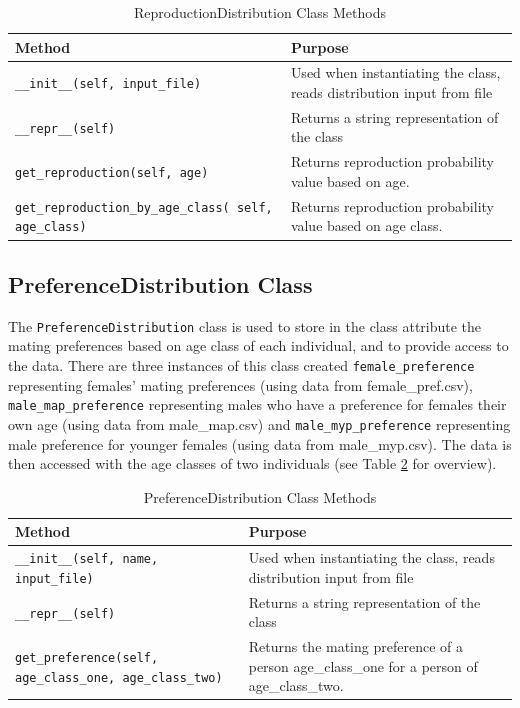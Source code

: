 \documentclass[authoryearcitations]{UoYCSproject}
\begin{document}
\begin{table}[h]
\caption{ReproductionDistribution Class Methods}
\label{tbl:reproductionDistributionMethods}
\begin{tabular}{m{} m{}}
\textbf{Method} & \textbf{Purpose} \\\hline
\texttt{\_\_init\_\_(self, input\_file)} & Used when instantiating the class, reads distribution input from file\\\hline
\texttt{\_\_repr\_\_(self)} & Returns a string representation of the class \\\hline
\texttt{get\_reproduction(self, age)} & Returns reproduction probability value based on age.\\\hline
\small\texttt{get\_reproduction\_by\_age\_class( self, age\_class)} \normalsize &  Returns reproduction probability value based on age class.
\end{tabular}
\end{table}

\subsection{PreferenceDistribution Class}
The \texttt{PreferenceDistribution} class is used to store in the class attribute \texttt{} the mating preferences based on age class of each individual, and to provide access to the data. There are three instances of this class created \texttt{female\_preference} representing females' mating preferences (using data from female\_pref.csv), \texttt{male\_map\_preference} representing males who have a preference for females their own age (using data from male\_map.csv) and \texttt{male\_myp\_preference} representing male preference for younger females (using data from male\_myp.csv). The data is then accessed with the age classes of two individuals (see Table \ref{tbl:preferenceDistributionMethods} for overview).

\begin{table}[h]
\caption{PreferenceDistribution Class Methods}
\label{tbl:preferenceDistributionMethods}
\begin{tabular}{m{} m{}}
\textbf{Method} & \textbf{Purpose} \\\hline
\texttt{\_\_init\_\_(self, name, input\_file)} & Used when instantiating the class, reads distribution input from file\\\hline
\texttt{\_\_repr\_\_(self)} & Returns a string representation of the class \\\hline
\texttt{get\_preference(self, age\_class\_one, age\_class\_two)} & Returns the mating preference of a person age\_class\_one for a person of age\_class\_two.
\end{tabular}
\end{table}
\end{document}
